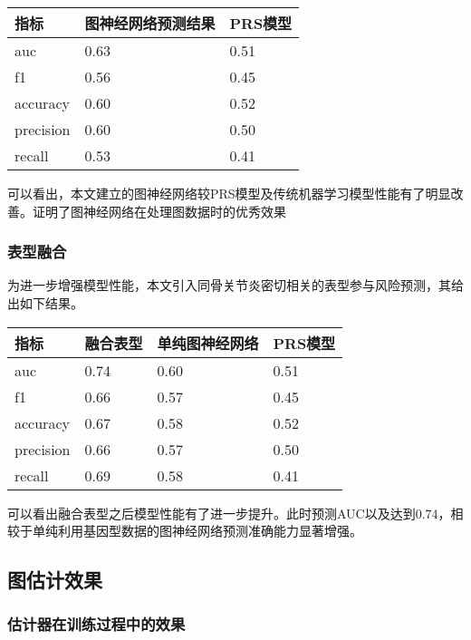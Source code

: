 \documentclass[
]{article}
\begin{document}
\begin{longtable}[]{@{}lll@{}}
\toprule()
指标 & 图神经网络预测结果 & PRS模型 \\
\midrule()
\endhead
auc & 0.63 & 0.51 \\
f1 & 0.56 & 0.45 \\
accuracy & 0.60 & 0.52 \\
precision & 0.60 & 0.50 \\
recall & 0.53 & 0.41 \\
\bottomrule()
\end{longtable}

可以看出，本文建立的图神经网络较PRS模型及传统机器学习模型性能有了明显改善。证明了图神经网络在处理图数据时的优秀效果

\hypertarget{ux8868ux578bux878dux5408-2}{%
\subsubsection{表型融合}\label{ux8868ux578bux878dux5408-2}}

为进一步增强模型性能，本文引入同骨关节炎密切相关的表型参与风险预测，其给出如下结果。

\begin{longtable}[]{@{}llll@{}}
\toprule()
指标 & 融合表型 & 单纯图神经网络 & PRS模型 \\
\midrule()
\endhead
auc & 0.74 & 0.60 & 0.51 \\
f1 & 0.66 & 0.57 & 0.45 \\
accuracy & 0.67 & 0.58 & 0.52 \\
precision & 0.66 & 0.57 & 0.50 \\
recall & 0.69 & 0.58 & 0.41 \\
\bottomrule()
\end{longtable}

可以看出融合表型之后模型性能有了进一步提升。此时预测AUC以及达到0.74，相较于单纯利用基因型数据的图神经网络预测准确能力显著增强。

\hypertarget{ux56feux4f30ux8ba1ux6548ux679c}{%
\subsection{图估计效果}\label{ux56feux4f30ux8ba1ux6548ux679c}}

\hypertarget{ux4f30ux8ba1ux5668ux5728ux8badux7ec3ux8fc7ux7a0bux4e2dux7684ux6548ux679c}{%
\subsubsection{估计器在训练过程中的效果}\label{ux4f30ux8ba1ux5668ux5728ux8badux7ec3ux8fc7ux7a0bux4e2dux7684ux6548ux679c}}
\end{document}
